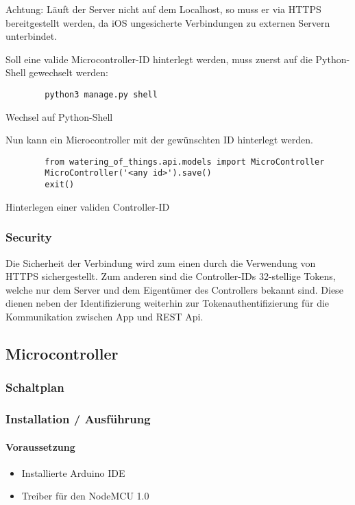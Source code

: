     Achtung: Läuft der Server nicht auf dem Localhost, so muss er via HTTPS bereitgestellt werden, da iOS ungesicherte Verbindungen zu externen Servern unterbindet.
    
    Soll eine valide Microcontroller-ID hinterlegt werden, muss zuerst auf die Python-Shell gewechselt werden:
    \begin{listing}[H]
        \begin{verbatim}
        python3 manage.py shell
        \end{verbatim}
        \caption{Wechsel auf Python-Shell}
    \end{listing}
    Nun kann ein Microcontroller mit der gewünschten ID hinterlegt werden.
    \begin{listing}[H]
        \begin{verbatim}
        from watering_of_things.api.models import MicroController
        MicroController('<any id>').save()
        exit()
        \end{verbatim}
        \caption{Hinterlegen einer validen Controller-ID}
    \end{listing}

    \subsubsection{Security}
    Die Sicherheit der Verbindung wird zum einen durch die Verwendung von HTTPS sichergestellt. Zum anderen sind die Controller-IDs 32-stellige Tokens, welche nur dem Server und dem Eigentümer des Controllers bekannt sind. Diese dienen neben der Identifizierung weiterhin zur Tokenauthentifizierung für die Kommunikation zwischen App und REST Api.
    
\subsection{Microcontroller}
    \subsubsection{Schaltplan}
    
    \subsubsection{Installation / Ausführung}
    
    \paragraph*{Voraussetzung}
    \begin{itemize}
        \item Installierte Arduino IDE
        \item Treiber für den NodeMCU 1.0
    \end{itemize}

